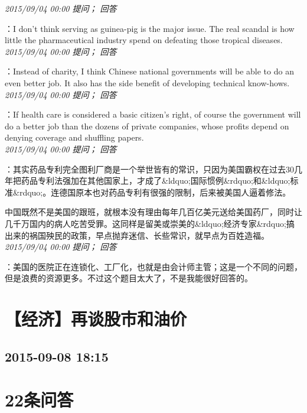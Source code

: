 \documentclass[twocolumn]{ctexart}
\begin{document}
\textit{\hfill\noindent\small 2015/09/04 00:00 提问； 回答}

：I don't think serving as guinea-pig is the major issue. The real scandal is how little the pharmaceutical industry spend on defeating those tropical diseases.\\

\textit{\hfill\noindent\small 2015/09/04 00:00 提问； 回答}

：Instead of charity, I think Chinese national governments will be able to do an even better job. It also has the side benefit of developing technical know-hows.\\

\textit{\hfill\noindent\small 2015/09/04 00:00 提问； 回答}

：If health care is considered a basic citizen's right, of course the government will do a better job than the dozens of private companies, whose profits depend on denying coverage and shuffling papers.\\

\textit{\hfill\noindent\small 2015/09/04 00:00 提问； 回答}

：其实药品专利完全图利厂商是一个举世皆有的常识，只因为美国霸权在过去30几年把药品专利法强加在其他国家上，才成了\&ldquo;国际惯例\&rdquo;和\&ldquo;标准\&rdquo;。连德国原本也对药品专利有很强的限制，后来被美国人逼着修法。

中国既然不是美国的跟班，就根本没有理由每年几百亿美元送给美国药厂，同时让几千万国内的病人吃苦受罪。这同样是留美或崇美的\&ldquo;经济专家\&rdquo;搞出来的祸国殃民的政策，早点抛弃迷信、长些常识，就早点为百姓造福。\\

\textit{\hfill\noindent\small 2015/09/04 00:00 提问； 回答}

：美国的医院正在连锁化、工厂化，也就是由会计师主管；这是一个不同的问题，但是浪费的资源更多。不过这个题目太大了，不是我能很好回答的。\\


\section{【经济】再谈股市和油价}
\subsection{2015-09-08 18:15}


\section{22条问答}
\end{document}
